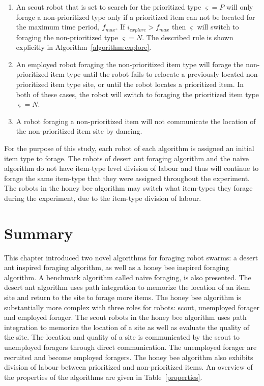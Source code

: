 \begin{enumerate}
\item An scout robot that is set to search for the prioritized type $\varsigma=P$ will only forage a non-prioritized type only if a prioritized item can not be located for the maximum time period, $f_{max}$. If $i_{explore} > f_{max}$ then $\varsigma$ will switch to foraging the non-prioritized type $\varsigma=N$. The described rule is shown explicitly in Algorithm~\ref{algorithm:explore}.
\item An employed robot foraging the non-prioritized item type will forage the non-prioritized item type until the robot fails to relocate a previously located non-prioritized item type site, or until the robot locates a prioritized item. In both of these cases, the robot will switch to foraging the prioritized item type $\varsigma=N$.
\item A robot foraging a non-prioritized item will not communicate the location of the non-prioritized item site by dancing. 
\end{enumerate}

For the purpose of this study, each robot of each algorithm is assigned an initial item type to forage. The robots of desert ant foraging algorithm and the na\"ive algorithm do not have item-type level division of labour and thus will continue to forage the same item-type that they were assigned throughout the experiment. The robots in the honey bee algorithm may switch what item-types they forage during the experiment, due to the item-type division of labour. 

\section{Summary}
\label{prioritized:summary}

This chapter introduced two novel algorithms for foraging robot swarms: a desert ant inspired foraging algorithm, as well as a honey bee inspired foraging algorithm. A benchmark algorithm called na\"ive foraging, is also presented. The desert ant algorithm uses path integration to memorize the location of an item site and return to the site to forage more items. The honey bee algorithm is substantially more complex with three roles for robots: scout, unemployed forager and employed forager. The scout robots in the honey bee algorithm uses path integration to memorize the location of a site as well as evaluate the quality of the site. The location and quality of a site is communicated by the scout to unemployed foragers through direct communication. The unemployed forager are recruited and become employed foragers. The honey bee algorithm also exhibits division of labour between prioritized and non-prioritized items. An overview of the properties of the algorithms are given in Table~\ref{properties}.

